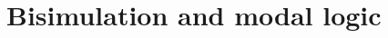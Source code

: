 \documentclass[11pt,a4paper,oldfontcommands]{memoir}
\newcommand*\jneda{\mathbf{j}}
\newtheorem{remark}[definition]{Remark}
\begin{document}

       
\section{Bisimulation and modal logic}\label{Sec: bis and ml}
\end{document}
